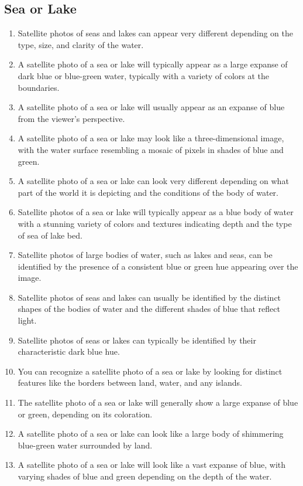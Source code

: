 \documentclass[11pt]{article}
\begin{document}
\subsection{Sea or Lake}
\begin{enumerate}
\item Satellite photos of seas and lakes can appear very different depending on the type, size, and clarity of the water.
\item A satellite photo of a sea or lake will typically appear as a large expanse of dark blue or blue-green water, typically with a variety of colors at the boundaries.
\item A satellite photo of a sea or lake will usually appear as an expanse of blue from the viewer's perspective.
\item A satellite photo of a sea or lake may look like a three-dimensional image, with the water surface resembling a mosaic of pixels in shades of blue and green.
\item A satellite photo of a sea or lake can look very different depending on what part of the world it is depicting and the conditions of the body of water.
\item Satellite photos of a sea or lake will typically appear as a blue body of water with a stunning variety of colors and textures indicating depth and the type of sea of lake bed.
\item Satellite photos of large bodies of water, such as lakes and seas, can be identified by the presence of a consistent blue or green hue appearing over the image.
\item Satellite photos of seas and lakes can usually be identified by the distinct shapes of the bodies of water and the different shades of blue that reflect light.
\item Satellite photos of seas or lakes can typically be identified by their characteristic dark blue hue.
\item You can recognize a satellite photo of a sea or lake by looking for distinct features like the borders between land, water, and any islands.
\item The satellite photo of a sea or lake will generally show a large expanse of blue or green, depending on its coloration.
\item A satellite photo of a sea or lake can look like a large body of shimmering blue-green water surrounded by land.
\item A satellite photo of a sea or lake will look like a vast expanse of blue, with varying shades of blue and green depending on the depth of the water.

\end{enumerate}
\end{document}
